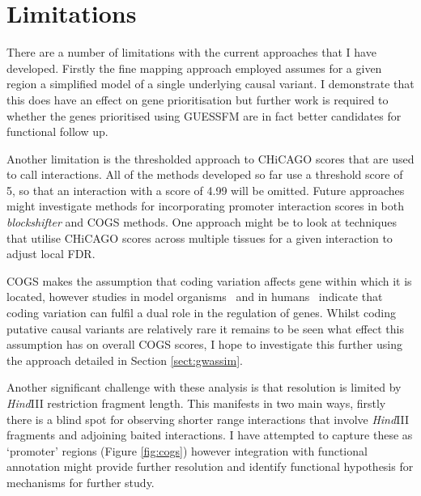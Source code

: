 \documentclass[a4paper,11pt]{report}
\begin{document}
\section{Limitations}
There are a number of limitations with the current approaches that I have developed. Firstly the fine mapping approach employed assumes for a given region a simplified model of a single underlying causal variant. I demonstrate that this does have an effect on gene prioritisation but further work is required to whether the genes prioritised using GUESSFM are in fact better candidates for functional follow up.

Another limitation is the thresholded approach to CHiCAGO scores that are used to call interactions. All of the methods developed so far use a threshold score of 5, so that an interaction with a score of 4.99 will be omitted. Future approaches might investigate methods for incorporating promoter interaction scores in both \textit{blockshifter} and COGS methods. One approach might be to look at techniques that utilise CHiCAGO scores across multiple tissues for a given interaction to adjust local FDR. 

COGS makes the assumption that coding variation affects gene within which it is located, however studies in model organisms~\citep{LawrieMesserHershbergEtAl2013} and in humans~\citep{StergachisHaugenShaferEtAl2013} indicate that coding variation can fulfil a dual role in the regulation of genes. Whilst coding putative causal variants are relatively rare it remains to be seen what effect this assumption has on overall COGS scores, I hope to investigate this further using the approach detailed in Section \ref{sect:gwassim}.

Another significant challenge with these analysis is that resolution is limited by \textit{Hind}III restriction fragment length. This manifests in two main ways, firstly there is a blind spot for observing shorter range interactions that involve \textit{Hind}III fragments and adjoining baited interactions. I have attempted to capture these as `promoter' regions (Figure \ref{fig:cogs}) however integration with functional annotation might provide further resolution and identify functional hypothesis for mechanisms for further study. 
\end{document}
